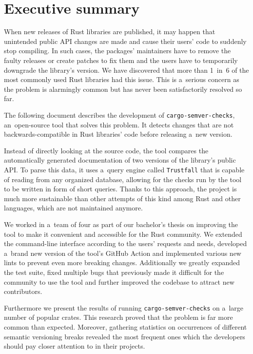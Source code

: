 \documentclass[licencjacka,en]{pracamgr}
\begin{document}

\chapter*{Executive summary}

When new releases of Rust libraries are published, it may happen that unintended public API changes
are made and cause their users' code to suddenly stop compiling. In such cases, the packages'
maintainers have to remove the faulty releases or create patches to fix them and the users
have to temporarily downgrade the library's version. We have discovered that more than 1~in~6
of the most commonly used Rust libraries had this issue. This is a~serious concern as the problem
is alarmingly common but has never been satisfactorily resolved so far.

The following document describes the development of \texttt{cargo-semver-checks}, an~open-source
tool that solves this problem. It detects changes that are
not backwards-compatible in Rust libraries' code before releasing a~new version.

Instead of directly looking at the source code, the tool compares the automatically generated
documentation of two versions of the library's public API. To parse this data, it uses
a~query engine called \texttt{Trustfall} that is capable of reading from any organized database,
allowing for the checks run by the tool to be written in form of short queries. Thanks to
this approach, the project is much more sustainable than other attempts of this kind among Rust
and other languages, which are not maintained anymore.

We worked in a~team of four as part of our bachelor's thesis on improving the tool to make it
convenient and accessible for the Rust community. We extended the command-line interface
according to the users' requests and needs, developed a~brand new version of
the tool's GitHub Action and implemented various new lints to prevent even more breaking changes.
Additionally we greatly expanded the test suite, fixed multiple bugs that previously
made it difficult for the community to use the tool and further improved the codebase to attract
new contributors.

Furthermore we present the results of running \texttt{cargo-semver-checks} on a~large number
of popular crates. This research proved that the problem is far more common than expected.
Moreover, gathering statistics on occurrences of different semantic versioning breaks
revealed the most frequent ones which the developers should pay closer attention to
in their projects.
\end{document}
